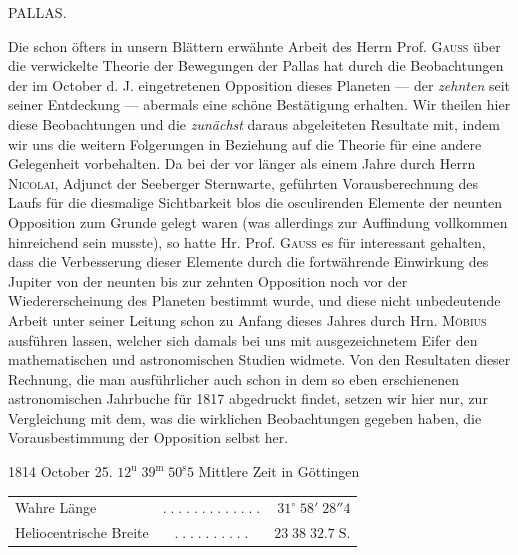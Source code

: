 \par{}\bigskip
\hypertarget{native-384-lower}{}\label{native-384-lower}
\begin{center}
\large PALLAS.
\end{center}

\par\indent Die schon öfters in unsern Blättern erwähnte Arbeit des Herrn Prof. \textsc{Gauss} über die
verwickelte Theorie der Bewegungen der Pallas hat durch die Beobachtungen der im October d. J.
eingetretenen Opposition dieses Planeten — der \emph{zehnten} seit seiner Entdeckung — abermals
eine schöne Bestätigung erhalten. Wir theilen hier diese Beobachtungen und die \emph{zunächst}
daraus abgeleiteten Resultate mit, indem wir uns die weitern Folgerungen in Beziehung auf die
Theorie für eine andere Gelegenheit vorbehalten. Da bei der vor länger als einem Jahre durch
Herrn \textsc{Nicolai}, Adjunct der Seeberger Sternwarte, geführten Vorausberechnung des Laufs
für die diesmalige Sichtbarkeit blos die osculirenden Elemente der neunten Opposition zum
Grunde gelegt waren (was allerdings zur Auffindung vollkommen hinreichend sein musste), so
hatte Hr. Prof. \textsc{Gauss} es für interessant gehalten, dass die Verbesserung dieser
Elemente durch die fortwährende Einwirkung des Jupiter von der neunten bis zur zehnten
Opposition noch vor der Wiedererscheinung des Planeten bestimmt wurde, und diese nicht
unbedeutende Arbeit unter seiner Leitung schon zu Anfang dieses Jahres durch Hrn.
\textsc{Möbius} ausführen lassen, welcher sich damals bei uns mit ausgezeichnetem Eifer den
mathematischen und astronomischen Studien widmete. Von den Resultaten dieser Rechnung, die man
ausführlicher auch schon in dem so eben erschienenen astronomischen Jahrbuche für 1817
abgedruckt findet, setzen wir hier nur, zur Vergleichung mit dem, was die wirklichen
Beobachtungen gegeben haben, die Vorausbestimmung der Opposition selbst her.

\begin{center}1814 October 25. $12^{\mathrm u}\;39^{\mathrm m}\;50^{\mathrm s}5$ Mittlere Zeit in Göttingen\end{center}
\begin{center}\fontsize{10}{12}\selectfont\setlength{\tabcolsep}{3pt}\renewcommand{\arraystretch}{1.15}\begin{tabular}{lcr}
Wahre Länge & $.\;.\;.\;.\;.\;.\;.\;.\;.\;.\;.\;.\;.$ & $31^\circ\;58'\;28''4$\\
Heliocentrische Breite & $.\;.\;.\;.\;.\;.\;.\;.\;.\;.$ & $23\;38\;32.7\;\mathrm{S.}$\\
\end{tabular}\end{center}

